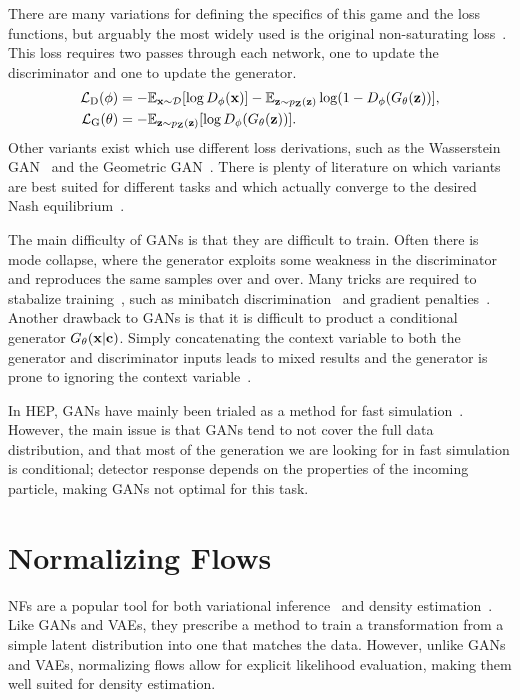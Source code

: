 There are many variations for defining the specifics of this game and the loss functions, but arguably the most widely used is the original non-saturating loss~\cite{GenerativeAdversarialNetworks}.
This loss requires two passes through each network, one to update the discriminator and one to update the generator.
\begin{align}
    \mathcal{L}_{\text{D}}(\phi) &= -\mathbb{E}_{\mathbf{x} \sim \mathcal{D}}[\log D_{\phi}(\mathbf{x})] - \mathbb{E}_{\mathbf{z} \sim p_{\mathbf{Z}}(\mathbf{z})}\log(1 - D_{\phi}(G_{\theta}(\mathbf{z}))], \\
    \mathcal{L}_{\text{G}}(\theta) &= -\mathbb{E}_{\mathbf{z} \sim p_{\mathbf{Z}}(\mathbf{z})}[\log D_{\phi}(G_{\theta}(\mathbf{z}))].
\end{align}
Other variants exist which use different loss derivations, such as the Wasserstein GAN~\cite{WGAN1} and the Geometric GAN~\cite{GeometricGAN}.
There is plenty of literature on which variants are best suited for different tasks and which actually converge to the desired Nash equilibrium~\cite{WhichTrainingMethods}.

The main difficulty of GANs is that they are difficult to train.
Often there is mode collapse, where the generator exploits some weakness in the discriminator and reproduces the same samples over and over.
Many tricks are required to stabalize training~\cite{WhichTrainingMethods}, such as minibatch discrimination~\cite{ProGAN} and gradient penalties~\cite{WGAN}.
Another drawback to GANs is that it is difficult to product a conditional generator $G_\theta(\mathbf{x}|\mathbf{c})$.
Simply concatenating the context variable to both the generator and discriminator inputs leads to mixed results and the generator is prone to ignoring the context variable~\cite{cGAN}.

In HEP, GANs have mainly been trialed as a method for fast simulation~\cite{MPGAN, GAPT, CaloGAN, EPICGAN}.
However, the main issue is that GANs tend to not cover the full data distribution, and that most of the generation we are looking for in fast simulation is conditional;
detector response depends on the properties of the incoming particle, making GANs not optimal for this task.

\section{Normalizing Flows}

NFs are a popular tool for both variational inference~\cite{VariationalInferenceNormalizing}
and density estimation~\cite{NICENonlinearIndependenta}.
Like GANs and VAEs, they prescribe a method to train a transformation from a simple latent distribution into one that matches the data.
However, unlike GANs and VAEs, normalizing flows allow for explicit likelihood evaluation, making them well suited for density estimation.

